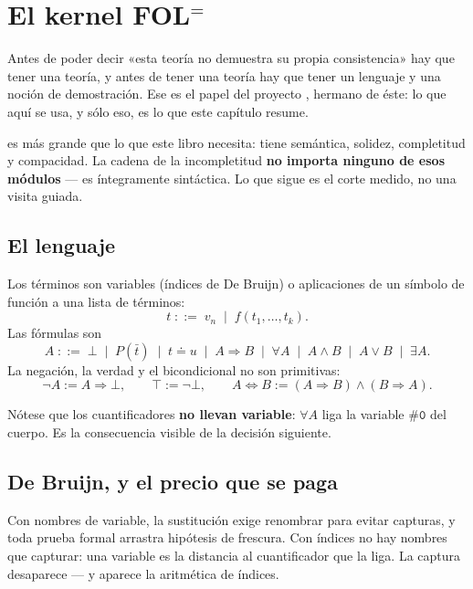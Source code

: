\chapter{El kernel \texorpdfstring{FOL$^=$}{FOL=}}
\label{cap:kernel}

Antes de poder decir «esta teoría no demuestra su propia consistencia» hay que tener una teoría, y
antes de tener una teoría hay que tener un lenguaje y una noción de demostración. Ese es el papel del
proyecto , hermano de éste: lo que aquí se usa, y sólo eso, es lo que este capítulo
resume.

\begin{leccion}
 es más grande que lo que este libro necesita: tiene semántica, solidez, completitud y
compacidad. La cadena de la incompletitud \textbf{no importa ninguno de esos módulos} — es
íntegramente sintáctica. Lo que sigue es el corte medido, no una visita guiada.
\end{leccion}

\section{El lenguaje}

\begin{matematica}
Los términos son variables (índices de De Bruijn) o aplicaciones de un símbolo de función a una
lista de términos:
\[ t \;::=\; v_n \;\mid\; f(t_1,\dots,t_k). \]
Las fórmulas son
\[ A \;::=\; \bot \;\mid\; P(\bar t) \;\mid\; t \doteq u \;\mid\; A \Rightarrow B
   \;\mid\; \forall A \;\mid\; A \wedge B \;\mid\; A \vee B \;\mid\; \exists A. \]
La negación, la verdad y el bicondicional no son primitivas:
\[ \lnot A := A \Rightarrow \bot, \qquad \top := \lnot\bot, \qquad
   A \Leftrightarrow B := (A \Rightarrow B) \wedge (B \Rightarrow A). \]
\end{matematica}


Nótese que los cuantificadores \textbf{no llevan variable}: \(\forall A\) liga la variable
\(\texttt{\#0}\) del cuerpo. Es la consecuencia visible de la decisión siguiente.

\section{De Bruijn, y el precio que se paga}

Con nombres de variable, la sustitución exige renombrar para evitar capturas, y toda prueba formal
arrastra hipótesis de frescura. Con índices no hay nombres que capturar: una variable es la distancia
al cuantificador que la liga. La captura desaparece — y aparece la aritmética de índices.

